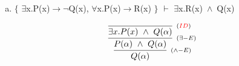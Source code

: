 \documentclass[aspectratio=43]{beamer}
\newcommand{\ria}{$\rightarrow$}
\newcommand{\fall}{$\forall$}
\newcommand{\ex}{$\exists$}
\newcommand{\nao}{$\neg$}
\newcommand{\andd}{$\wedge$}
\begin{document}
    \begin{frame}[fragile]
    
    	\begin{enumerate}[d)]
			\item $\{$ \ex x.P(x)\ria \nao Q(x), \fall x.P(x)\ria R(x) $\}$ $\vdash$ \ex x.R(x)\ \andd\ Q(x) \\
		\end{enumerate}
        
        \vspace{80pt}
        
        \[
        \begin{array}{c}
		
        	\infer[_{(\land -E)}] 
                	{Q(\alpha)}
                    {\infer[_{(\exists -E)}]
                    	{P(\alpha)\ \land \ Q(\alpha)}
                    	{\infer[_{(\textcolor{red}{ID})}]
                        	{\exists x.P(x)\ \land \ Q(\alpha)}
                            {}
                        }
                    }
		\end{array}
        \]
        
	\end{frame}
    
\end{document}
